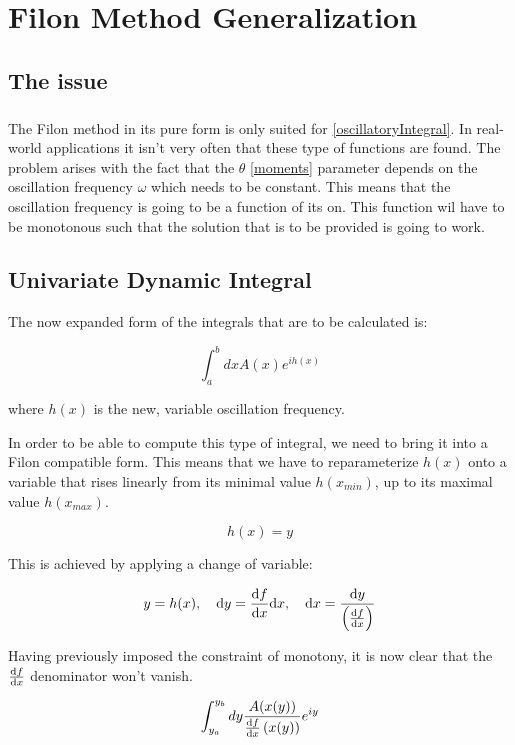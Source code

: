 \chapter{Filon Method Generalization}

\section{The issue}

\paragraph{} The Filon method in its pure form is only suited for \eqref{oscillatoryIntegral}.
In real-world applications it isn't very often that these type of functions are found. The problem arises with the fact that the $\theta$ \eqref{moments} parameter depends on the oscillation frequency $\omega$ which needs to be constant.
This means that the oscillation frequency is going to be a function of its on. This function wil have to be monotonous such that the solution that is to be provided is going to work. 

\section{Univariate Dynamic Integral}

The now expanded form of the integrals that are to be calculated is:

\begin{equation}
    \int_{a}^{b}dxA(x)e^{ih(x)}
\end{equation}

where $h(x)$ is the new, variable oscillation frequency.

In order to be able to compute this type of integral, we need to bring it into a Filon compatible form. This means that we have to reparameterize $h(x)$ onto a variable that rises linearly from its minimal value $h(x_{min})$, up to its maximal value $h(x_{max})$.

\begin{equation}
    h(x)=y \label{parameterization}   
\end{equation}

This is achieved by applying a change of variable:

\begin{equation}
    y=h(x), \quad \dd y=\dv{f}{x} \dd x, \quad \dd x=\frac{\dd y}{\left(\dv{f}{x}\right)} \label{changeOfVariable}
\end{equation}

Having previously imposed the constraint of monotony, it is now clear that the $\dv{f}{x}$ denominator won't vanish.

\begin{equation}
    \int_{y_a}^{y_b}dy\frac{A(x(y))}{\dv{f}{x}\left(x(y)\right)}e^{iy}
\end{equation}



